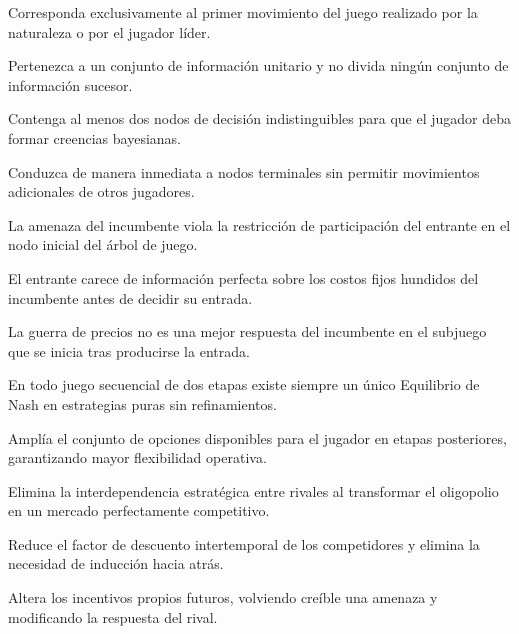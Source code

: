 \begin{opts}
    \item Corresponda exclusivamente al primer movimiento del juego realizado por la naturaleza o por el jugador líder.
    \item Pertenezca a un conjunto de información unitario y no divida ningún conjunto de información sucesor.
    \item Contenga al menos dos nodos de decisión indistinguibles para que el jugador deba formar creencias bayesianas.
    \item Conduzca de manera inmediata a nodos terminales sin permitir movimientos adicionales de otros jugadores.
\end{opts}

\begin{opts}
    \item La amenaza del incumbente viola la restricción de participación del entrante en el nodo inicial del árbol de juego.
    \item El entrante carece de información perfecta sobre los costos fijos hundidos del incumbente antes de decidir su entrada.
    \item La guerra de precios no es una mejor respuesta del incumbente en el subjuego que se inicia tras producirse la entrada.
    \item En todo juego secuencial de dos etapas existe siempre un único Equilibrio de Nash en estrategias puras sin refinamientos.
\end{opts}

\begin{opts}
    \item Amplía el conjunto de opciones disponibles para el jugador en etapas posteriores, garantizando mayor flexibilidad operativa.
    \item Elimina la interdependencia estratégica entre rivales al transformar el oligopolio en un mercado perfectamente competitivo.
    \item Reduce el factor de descuento intertemporal de los competidores y elimina la necesidad de inducción hacia atrás.
    \item Altera los incentivos propios futuros, volviendo creíble una amenaza y modificando la respuesta del rival.
\end{opts}

